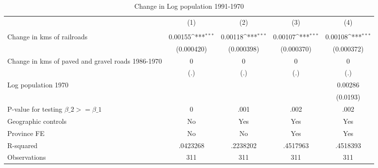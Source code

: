 \begin{table}[htbp]\centering
\def\sym#1{\ifmmode^{#1}\else\(^{#1}\)\fi}
\caption{Change in Log population 1991-1970}
\begin{tabular}{l*{4}{c}}
\hline\hline
                &\multicolumn{1}{c}{(1)}&\multicolumn{1}{c}{(2)}&\multicolumn{1}{c}{(3)}&\multicolumn{1}{c}{(4)}\\
                &\multicolumn{1}{c}{}&\multicolumn{1}{c}{}&\multicolumn{1}{c}{}&\multicolumn{1}{c}{}\\
\hline
Change in kms of railroads&  0.00155\sym{***}&  0.00118\sym{***}&  0.00107\sym{***}&  0.00108\sym{***}\\
                &(0.000420)         &(0.000398)         &(0.000370)         &(0.000372)         \\
[1em]
Change in kms of paved and gravel roads 1986-1970&        0         &        0         &        0         &        0         \\
                &      (.)         &      (.)         &      (.)         &      (.)         \\
[1em]
Log population 1970&                  &                  &                  &  0.00286         \\
                &                  &                  &                  & (0.0193)         \\
\hline
P-value for testing $\beta\_{2} >= \beta\_{1}$&        0         &     .001         &     .002         &     .002         \\
Geographic controls&       No         &      Yes         &      Yes         &      Yes         \\
Province FE     &       No         &       No         &      Yes         &      Yes         \\
R-squared       & .0423268         & .2238202         & .4517963         & .4518393         \\
Observations    &      311         &      311         &      311         &      311         \\
\hline\hline
\end{tabular}
\end{table}
